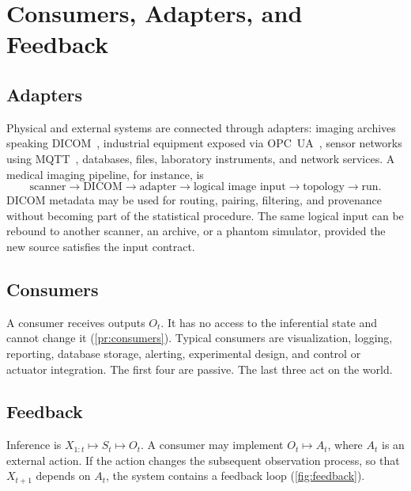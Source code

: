 \documentclass[11pt,a4paper]{article}
\theoremstyle{definition}
\theoremstyle{remark}
\begin{document}
\section{Consumers, Adapters, and Feedback}
\label{sec:consumers}

\subsection{Adapters}
\label{sec:adapters}

Physical and external systems are connected through adapters: imaging
archives speaking DICOM~\cite{dicom}, industrial equipment exposed via
OPC~UA~\cite{opcua}, sensor networks using MQTT~\cite{mqtt}, databases,
files, laboratory instruments, and network services. A medical imaging
pipeline, for instance, is
\[
\text{scanner}
\rightarrow
\text{DICOM}
\rightarrow
\text{adapter}
\rightarrow
\text{logical image input}
\rightarrow
\text{topology}
\rightarrow
\text{run}.
\]
DICOM metadata may be used for routing, pairing, filtering, and
provenance without becoming part of the statistical procedure. The same
logical input can be rebound to another scanner, an archive, or a
phantom simulator, provided the new source satisfies the input contract.

\subsection{Consumers}

A consumer receives outputs $O_t$. It has no access to the inferential
state and cannot change it (\cref{pr:consumers}). Typical consumers are
visualization, logging, reporting, database storage, alerting,
experimental design, and control or actuator integration. The first
four are passive. The last three act on the world.

\subsection{Feedback}
\label{sec:feedback}

Inference is $X_{1:t}\mapsto S_t\mapsto O_t$. A consumer may implement
$O_t\mapsto A_t$, where $A_t$ is an external action. If the action
changes the subsequent observation process, so that $X_{t+1}$ depends on
$A_t$, the system contains a feedback loop (\cref{fig:feedback}).
\end{document}
